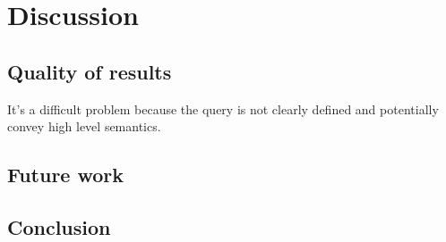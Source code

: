 \chapter{Discussion}
\label{chap:discussion}

\section{Quality of results}

It's a difficult problem because the query is not clearly defined and
potentially convey high level semantics.

\section{Future work}

\section{Conclusion}
